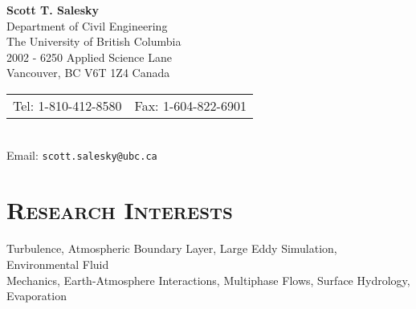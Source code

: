\documentclass[11pt,letterpaper]{article}
\begin{document}

\pagestyle{empty}           %
\pagestyle{fancy}
\fancyfoot{}                        %
\fancyhead{}                        %
\renewcommand{\headrulewidth}{0pt}

\begin{center}
    \textbf{\Large Scott T. Salesky} \\
    Department of Civil Engineering \\
    The University of British Columbia \\
    2002 - 6250 Applied Science Lane \\
    Vancouver, BC V6T 1Z4 Canada \\
    \begin{tabular}{c c}
        Tel: 1-810-412-8580 & Fax: 1-604-822-6901
    \end{tabular} \\
    Email: \texttt{scott.salesky@ubc.ca}
\end{center}

\section*{\textsc{Research Interests}} 

Turbulence, Atmospheric Boundary Layer, Large Eddy Simulation, Environmental Fluid \\ Mechanics,
Earth-Atmosphere Interactions, Multiphase Flows, Surface Hydrology, Evaporation 

\end{document}

